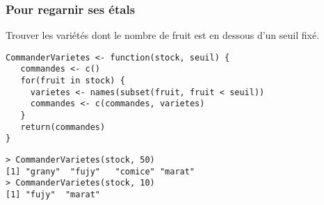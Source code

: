 \documentclass[10pt]{beamer}
\begin{document}
\begin{frame}[fragile]
  \frametitle{Pour regarnir ses étals}
  Trouver les variétés dont le nombre de fruit est en dessous d'un seuil fixé.
  \begin{lstlisting}[style=editor]
  CommanderVarietes <- function(stock, seuil) {
   commandes <- c()
   for(fruit in stock) {
     varietes <- names(subset(fruit, fruit < seuil))
     commandes <- c(commandes, varietes)
   }
   return(commandes)
}
\end{lstlisting}

\begin{lstlisting}
> CommanderVarietes(stock, 50)
[1] "grany"  "fujy"   "comice" "marat"
> CommanderVarietes(stock, 10)
[1] "fujy"  "marat"
\end{lstlisting}
\end{frame}


\questionSlide

 \appendix
 \backupSlides







\end{document}
